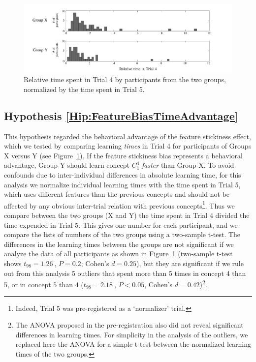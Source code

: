  
 \begin{figure}
\begin{center}
	\includegraphics[scale=.5]{Images/results_2.pdf}
\end{center}\caption{Relative time spent in Trial 4 by participants from the two groups, normalized by the time spent in Trial 5.}
\label{fig:results2}
\end{figure}



\subsection{Hypothesis \ref{Hip:FeatureBiasTimeAdvantage}}\label{Results:FeatureBiasTimeAdvantage} 
This hypothesis regarded the behavioral advantage of the feature stickiness effect, which we tested by comparing learning \emph{times} in Trial 4 for participants of Groups X versus Y (see Figure~\ref{fig:results2}).
If the feature stickiness bias represents a behavioral advantage, Group Y should learn concept $C^4_1$ \emph{faster} than Group X. To avoid confounds due to inter-individual differences in absolute learning time, for this analysis we normalize individual learning times with the time spent in Trial 5, which uses different features than the previous concepts and should not be affected by any obvious inter-trial relation with previous concepts\footnote{Indeed, Trial 5 was pre-registered as a `normalizer' trial.}. Thus we compare between the two groups (X and Y) the time spent in Trial 4 divided the time expended in Trial 5. This gives one number for each participant, and we compare the lists of numbers of the two groups using a two-sample t-test.  The differences in the learning times between the groups are not significant if we analyze the data of all participants as shown in Figure~\ref{fig:results2} (two-sample t-test shows $t_{98}=1.26 \ $,  $P=0.2$; Cohen's $d=0.25$), but they are significant if we rule out from this analysis 5 outliers that spent more than 5 times in concept 4 than 5, or in concept 5 than 4 ($t_{98}=2.18 \ $,  $P<0.05$, Cohen's $d=0.42$)\footnote{The ANOVA proposed in the pre-registration also did not reveal significant differences in learning times. For simplicity in the analysis of the outliers, we replaced here the ANOVA for a simple t-test between the normalized learning times of the two groups.}.



